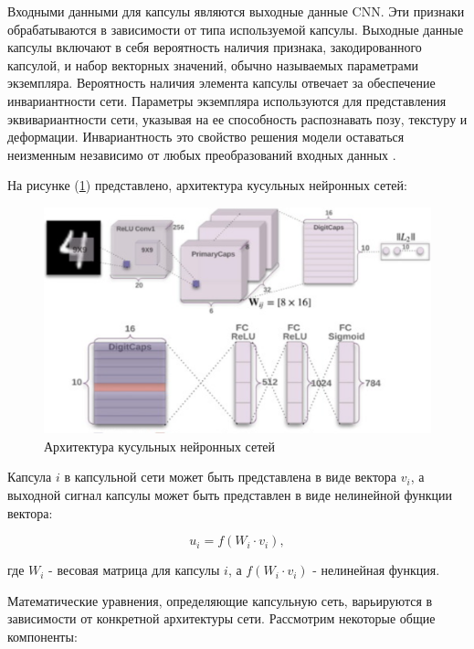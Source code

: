 Входными данными для капсулы являются выходные данные CNN. Эти признаки обрабатываются в зависимости от типа используемой капсулы. Выходные данные капсулы включают в себя вероятность наличия признака, закодированного капсулой, и набор векторных значений, обычно называемых параметрами экземпляра. Вероятность наличия элемента капсулы отвечает за обеспечение инвариантности сети. Параметры экземпляра используются для представления эквивариантности сети, указывая на ее способность распознавать позу, текстуру и деформации. Инвариантность это свойство решения модели оставаться неизменным независимо от любых преобразований входных данных \cite{patrick2022capsule}.

На рисунке (\ref{fig:residual-block}) представлено, архитектура кусульных нейронных сетей: 
\begin{figure}[H]
	\centering
	\includegraphics[width=0.6\linewidth]{assets/capsnet.png}
	\caption{Архитектура кусульных нейронных сетей}
	\label{fig:residual-block}
\end{figure}

Капсула \(i\) в капсульной сети может быть представлена в виде вектора \(v_{i}\), а выходной сигнал капсулы может быть представлен в виде нелинейной функции вектора:

\begin{equation}
    u_{i} = f(W_{i} \cdot v_{i}),
\end{equation}

где \(W_{i}\) - весовая матрица для капсулы \(i\), а \(f(W_{i} \cdot v_{i})\) - нелинейная функция.

Математические уравнения, определяющие капсульную сеть, варьируются в зависимости от конкретной архитектуры сети. Рассмотрим некоторые общие компоненты:

